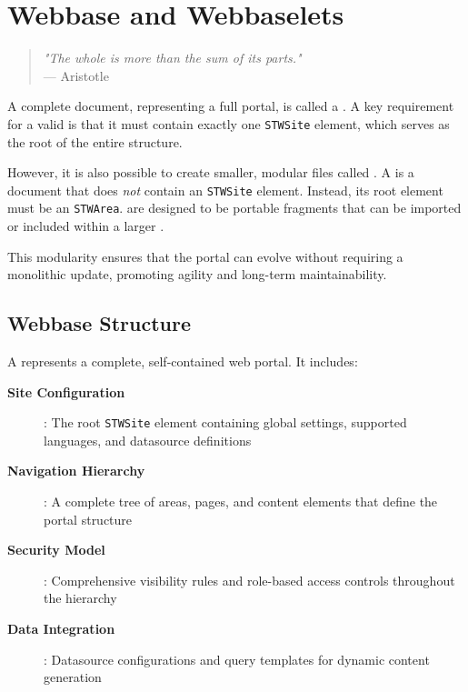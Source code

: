 
\chapter{Webbase and Webbaselets}
\label{chap:webbase-webbaselets}

\begin{quote}
\textit{"The whole is more than the sum of its parts."} \\
— Aristotle
\end{quote}

A complete \wbdl{} document, representing a full portal, is called a \textbf{\webbase{}}. A key requirement for a valid \webbase{} is that it must contain exactly one \texttt{STWSite} element, which serves as the root of the entire structure.

However, it is also possible to create smaller, modular \wbdl{} files called \textbf{}. A \webbaselet{} is a \wbdl{} document that does \emph{not} contain an \texttt{STWSite} element. Instead, its root element must be an \texttt{STWArea}.  are designed to be portable fragments that can be imported or included within a larger \webbase{}.

This modularity ensures that the portal can evolve without requiring a monolithic update, promoting agility and long-term maintainability.

\section{Webbase Structure}
\label{sec:webbase-structure}

A \webbase{} represents a complete, self-contained web portal. It includes:

\begin{description}
\item[\textbf{Site Configuration}]: The root \texttt{STWSite} element containing global settings, supported languages, and datasource definitions
\item[\textbf{Navigation Hierarchy}]: A complete tree of areas, pages, and content elements that define the portal structure
\item[\textbf{Security Model}]: Comprehensive visibility rules and role-based access controls throughout the hierarchy
\item[\textbf{Data Integration}]: Datasource configurations and query templates for dynamic content generation
\end{description}

